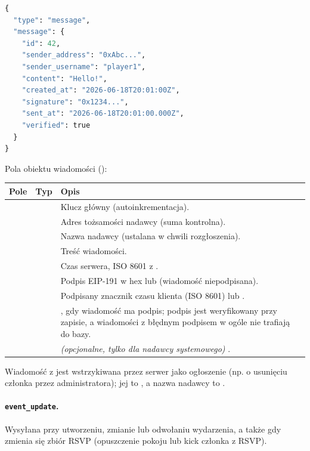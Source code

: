 \begin{lstlisting}[language=Python]
{
  "type": "message",
  "message": {
    "id": 42,
    "sender_address": "0xAbc...",
    "sender_username": "player1",
    "content": "Hello!",
    "created_at": "2026-06-18T20:01:00Z",
    "signature": "0x1234...",
    "sent_at": "2026-06-18T20:01:00.000Z",
    "verified": true
  }
}
\end{lstlisting}

Pola obiektu wiadomości ():

\begin{tabularx}{\textwidth}{llY}
\toprule
Pole & Typ & Opis \\
\midrule
{} &  & Klucz główny (autoinkrementacja). \\
 &  & Adres tożsamości nadawcy (suma kontrolna). \\
 &  & Nazwa nadawcy (ustalana w chwili rozgłoszenia). \\
 &  & Treść wiadomości. \\
 &  & Czas serwera, ISO 8601 z . \\
 &  & Podpis EIP-191 w hex lub  (wiadomość niepodpisana). \\
 &  & Podpisany znacznik czasu klienta (ISO 8601) lub . \\
 &  & , gdy wiadomość ma podpis; podpis jest weryfikowany przy zapisie, a wiadomości z błędnym podpisem w ogóle nie trafiają do bazy. \\
 &  & \emph{(opcjonalne, tylko dla nadawcy systemowego)} . \\
\bottomrule
\end{tabularx}

Wiadomość z  jest wstrzykiwana przez serwer jako ogłoszenie (np. o usunięciu
członka przez administratora); jej  to , a nazwa nadawcy
to .

\paragraph{\texttt{event\_update}.} Wysyłana przy utworzeniu, zmianie lub odwołaniu wydarzenia, a także
gdy zmienia się zbiór RSVP (opuszczenie pokoju lub kick członka z RSVP).

